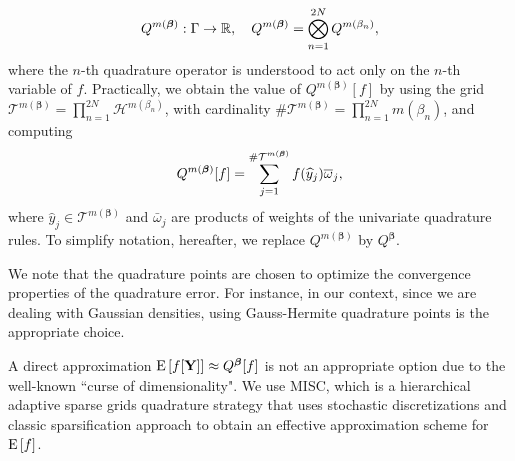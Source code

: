 $$Q^{m(\boldsymbol{\beta})}: \Gamma \rightarrow \mathbb{R},\quad  Q^{m(\boldsymbol{\beta})}= \bigotimes_{n = 1}^{2N} Q^{m(\beta_n)} , $$
where the $n$-th quadrature operator is understood to act only on the $n$-th variable of $f$. Practically, we obtain the value of $Q^{m(\boldsymbol{\beta})}[f]$  by using the grid $\mathcal{T}^{m(\boldsymbol{\beta})}= \prod_{n = 1}^{2N}  \mathcal{H}^{m(\beta_n)}$, with cardinality $\#\mathcal{T}^{m(\boldsymbol{\beta})}=\prod_{n=1}^{2N} m (\beta_n)$, and computing
$$ Q^{m(\boldsymbol{\beta})}[f]= \sum_{j=1}^{\#\mathcal{T}^{m(\boldsymbol{\beta})}} f(\widehat{y}_j) \overline{\omega}_j ,$$
where $\hat{y}_j \in \mathcal{T}^{m(\boldsymbol{\beta})}$ and $\bar{\omega}_j$ are  products of weights of the univariate quadrature rules. To simplify notation, hereafter, we replace  $Q^{m(\boldsymbol{\beta})}$ by $Q^{\boldsymbol{\beta}}$.

\begin{remark}
We note that the quadrature points are chosen to optimize the convergence properties of the quadrature error.  For instance, in our context, since we are dealing with Gaussian densities, using Gauss-Hermite quadrature points is the appropriate choice.
\end{remark}
A direct approximation $\mathrm{E}\left[f[\mathbf{Y}]\right] \approx Q^{\boldsymbol{\beta}}[f]$ is not an appropriate option  due to the well-known ``curse of dimensionality". We use MISC, which is a hierarchical adaptive sparse grids quadrature strategy that uses  stochastic discretizations  and classic sparsification approach to obtain an effective approximation scheme for $\mathrm{E}\left[f\right]$. 

